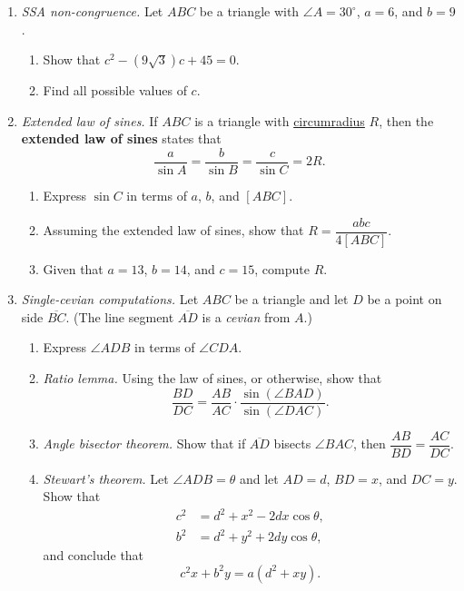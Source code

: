 \begin{enumerate}
\item \emph{SSA non-congruence.} Let $ABC$ be a triangle with $\angle A = 30^{\circ}$, $a = 6$, and $b = 9$.
\begin{enumerate}
\item Show that $c^2 - (9\sqrt{3})c + 45 = 0$.
\item Find all possible values of $c$.
\end{enumerate}
\item \emph{Extended law of sines.} If $ABC$ is a triangle with \href{https://en.wikipedia.org/wiki/Circumcircle}{circumradius} $R$, then the \textbf{extended law of sines} states that
\begin{equation*}
\frac{a}{\sin A} = \frac{b}{\sin B} = \frac{c}{\sin C} = 2R.
\end{equation*}
\begin{enumerate}
\item Express $\sin C$ in terms of $a$, $b$, and $[ABC]$.
\item Assuming the extended law of sines, show that $R = \dfrac{abc}{4[ABC]}$.
\item Given that $a = 13$, $b = 14$, and $c = 15$, compute $R$.
\end{enumerate}
\item \emph{Single-cevian computations.} Let $ABC$ be a triangle and let $D$ be a point on side $\overline{BC}$. (The line segment $\overline{AD}$ is a \emph{cevian} from $A$.)
\begin{enumerate}
\item Express $\angle ADB$ in terms of $\angle CDA$.
\item \emph{Ratio lemma.} Using the law of sines, or otherwise, show that
\begin{equation*}
\frac{BD}{DC} = \frac{AB}{AC}\cdot\frac{\sin(\angle BAD)}{\sin(\angle DAC)}.
\end{equation*}
\item \emph{Angle bisector theorem.} Show that if $\overline{AD}$ bisects $\angle BAC$, then $\dfrac{AB}{BD} = \dfrac{AC}{DC}$.
\item \emph{Stewart's theorem.} Let $\angle ADB = \theta$ and let $AD = d$, $BD = x$, and $DC = y$. Show that
\begin{align*}
c^2 &= d^2 + x^2 - 2dx\cos\theta, \\
b^2 &= d^2 + y^2 + 2dy\cos\theta,
\end{align*}
and conclude that
\begin{equation*}
c^2x + b^2y = a(d^2 + xy).
\end{equation*}

\end{enumerate}
\end{enumerate}
